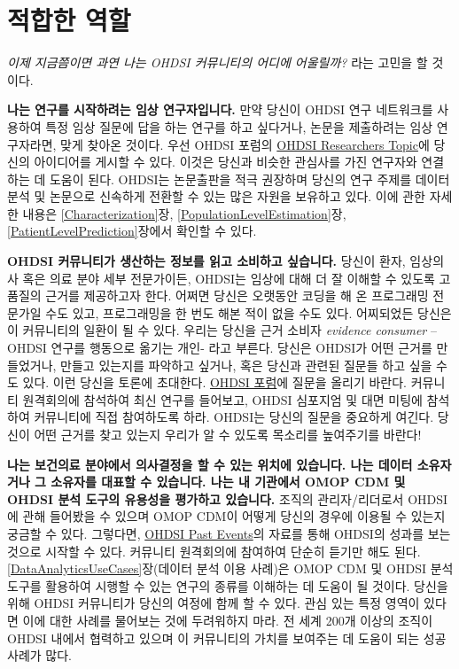 \documentclass[10.5pt]{book}
\theoremstyle{definition}
\theoremstyle{definition}
\theoremstyle{definition}
\theoremstyle{remark}
\begin{document}
\section{적합한 역할}\label{-}

\emph{이제 지금쯤이면 과연 나는 OHDSI 커뮤니티의 어디에 어울릴까?} 라는
고민을 할 것이다.

\textbf{나는 연구를 시작하려는 임상 연구자입니다.} 만약 당신이 OHDSI
연구 네트워크를 사용하여 특정 임상 질문에 답을 하는 연구를 하고
싶다거나, 논문을 제출하려는 임상 연구자라면, 맞게 찾아온 것이다. 우선
OHDSI 포럼의 \href{https://forums.ohdsi.org/c/researchers}{OHDSI
Researchers Topic}에 당신의 아이디어를 게시할 수 있다. 이것은 당신과
비슷한 관심사를 가진 연구자와 연결하는 데 도움이 된다. OHDSI는
논문출판을 적극 권장하며 당신의 연구 주제를 데이터 분석 및 논문으로
신속하게 전환할 수 있는 많은 자원을 보유하고 있다. 이에 관한 자세한
내용은 \ref{Characterization}장, \ref{PopulationLevelEstimation}장,
\ref{PatientLevelPrediction}장에서 확인할 수 있다.

\textbf{OHDSI 커뮤니티가 생산하는 정보를 읽고 소비하고 싶습니다.} 당신이
환자, 임상의사 혹은 의료 분야 세부 전문가이든, OHDSI는 임상에 대해 더 잘
이해할 수 있도록 고품질의 근거를 제공하고자 한다. 어쩌면 당신은 오랫동안
코딩을 해 온 프로그래밍 전문가일 수도 있고, 프로그래밍을 한 번도 해본
적이 없을 수도 있다. 어찌되었든 당신은 이 커뮤니티의 일환이 될 수 있다.
우리는 당신을 근거 소비자 \emph{evidence consumer} -- OHDSI 연구를
행동으로 옮기는 개인- 라고 부른다. 당신은 OHDSI가 어떤 근거를
만들었거나, 만들고 있는지를 파악하고 싶거나, 혹은 당신과 관련된 질문들
하고 싶을 수도 있다. 이런 당신을 토론에 초대한다.
\href{http://forum.ohdsi.org}{OHDSI 포럼}에 질문을 올리기 바란다.
커뮤니티 원격회의에 참석하여 최신 연구를 들어보고, OHDSI 심포지엄 및
대면 미팅에 참석하여 커뮤니티에 직접 참여하도록 하라. OHDSI는 당신의
질문을 중요하게 여긴다. 당신이 어떤 근거를 찾고 있는지 우리가 알 수
있도록 목소리를 높여주기를 바란다!

\textbf{나는 보건의료 분야에서 의사결정을 할 수 있는 위치에 있습니다.
나는 데이터 소유자거나 그 소유자를 대표할 수 있습니다. 나는 내 기관에서
OMOP CDM 및 OHDSI 분석 도구의 유용성을 평가하고 있습니다.} 조직의
관리자/리더로서 OHDSI에 관해 들어봤을 수 있으며 OMOP CDM이 어떻게 당신의
경우에 이용될 수 있는지 궁금할 수 있다. 그렇다면,
\href{https://www.ohdsi.org/past-events/}{OHDSI Past Events}의 자료를
통해 OHDSI의 성과를 보는 것으로 시작할 수 있다. 커뮤니티 원격회의에
참여하여 단순히 듣기만 해도 된다. \ref{DataAnalyticsUseCases}장(데이터
분석 이용 사례)은 OMOP CDM 및 OHDSI 분석 도구를 활용하여 시행할 수 있는
연구의 종류를 이해하는 데 도움이 될 것이다. 당신을 위해 OHDSI 커뮤니티가
당신의 여정에 함께 할 수 있다. 관심 있는 특정 영역이 있다면 이에 대한
사례를 물어보는 것에 두려워하지 마라. 전 세계 200개 이상의 조직이 OHDSI
내에서 협력하고 있으며 이 커뮤니티의 가치를 보여주는 데 도움이 되는 성공
사례가 많다.
\end{document}
